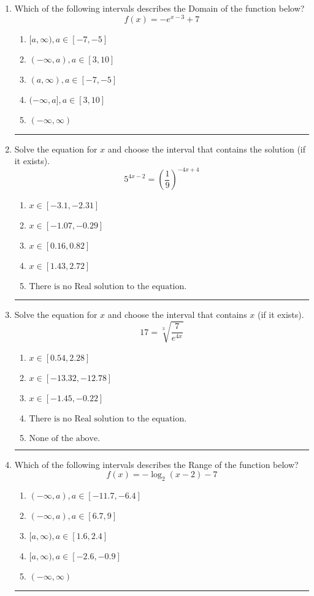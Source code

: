 \documentclass[14pt]{extbook}
\newcommand{\litem}[1]{\item#1\hspace*{-1cm}\rule{\textwidth}{0.4pt}}
\begin{document}
\begin{enumerate}
{\begin{enumerate}[label=\Alph*.]
\end{enumerate} }
\litem{
Which of the following intervals describes the Domain of the function below?\[ f(x) = -e^{x-3}+7 \]\begin{enumerate}[label=\Alph*.]
\item \( [a, \infty), a \in [-7, -5] \)
\item \( (-\infty, a), a \in [3, 10] \)
\item \( (a, \infty), a \in [-7, -5] \)
\item \( (-\infty, a], a \in [3, 10] \)
\item \( (-\infty, \infty) \)

\end{enumerate} }
\litem{
Solve the equation for $x$ and choose the interval that contains the solution (if it exists).\[ 5^{4x-2} = \left(\frac{1}{9}\right)^{-4x+4} \]\begin{enumerate}[label=\Alph*.]
\item \( x \in [-3.1, -2.31] \)
\item \( x \in [-1.07, -0.29] \)
\item \( x \in [0.16, 0.82] \)
\item \( x \in [1.43, 2.72] \)
\item \( \text{There is no Real solution to the equation.} \)

\end{enumerate} }
\litem{
 Solve the equation for $x$ and choose the interval that contains $x$ (if it exists).\[  17 = \sqrt[3]{\frac{7}{e^{4x}}} \]\begin{enumerate}[label=\Alph*.]
\item \( x \in [0.54, 2.28] \)
\item \( x \in [-13.32, -12.78] \)
\item \( x \in [-1.45, -0.22] \)
\item \( \text{There is no Real solution to the equation.} \)
\item \( \text{None of the above.} \)

\end{enumerate} }
\litem{
Which of the following intervals describes the Range of the function below?\[ f(x) = -\log_2{(x-2)}-7 \]\begin{enumerate}[label=\Alph*.]
\item \( (-\infty, a), a \in [-11.7, -6.4] \)
\item \( (-\infty, a), a \in [6.7, 9] \)
\item \( [a, \infty), a \in [1.6, 2.4] \)
\item \( [a, \infty), a \in [-2.6, -0.9] \)
\item \( (-\infty, \infty) \)


\end{enumerate}}
\end{enumerate}
\end{document}
